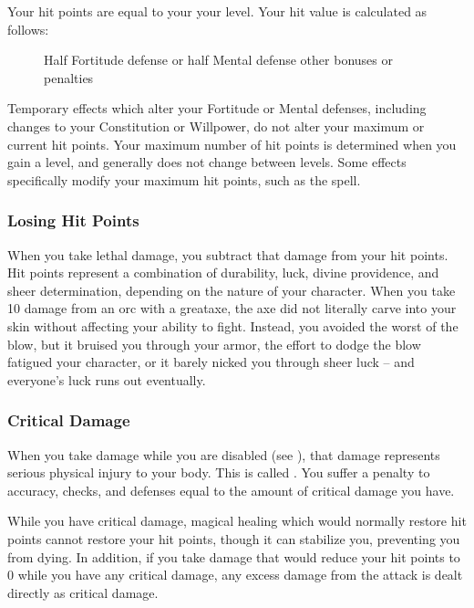             Your hit points are equal to your  \x your level.
            Your hit value is calculated as follows:

            \begin{figure}[h]
                \centering Half Fortitude defense or half Mental defense \add other bonuses or penalties
            \end{figure}

             Temporary effects which alter your Fortitude or Mental defenses, including changes to your Constitution or Willpower, do not alter your maximum or current hit points.
            Your maximum number of hit points is determined when you gain a level, and generally does not change between levels.
            Some effects specifically modify your maximum hit points, such as the  spell.

        \subsubsection{Losing Hit Points}
            When you take lethal damage, you subtract that damage from your hit points.
             Hit points represent a combination of durability, luck, divine providence, and sheer determination, depending on the nature of your character.
            When you take 10 damage from an orc with a greataxe, the axe did not literally carve into your skin without affecting your ability to fight.
            Instead, you avoided the worst of the blow, but it bruised you through your armor, the effort to dodge the blow fatigued your character, or it barely nicked you through sheer luck -- and everyone's luck runs out eventually.

        \subsubsection{Critical Damage}\label{Critical Damage}
            When you take damage while you are disabled (see ), that damage represents serious physical injury to your body.
            This is called .
            You suffer a penalty to accuracy, checks, and defenses equal to the amount of critical damage you have.

            While you have critical damage, magical healing which would normally restore hit points cannot restore your hit points, though it can stabilize you, preventing you from dying.
            In addition, if you take damage that would reduce your hit points to 0 while you have any critical damage, any excess damage from the attack is dealt directly as critical damage.

